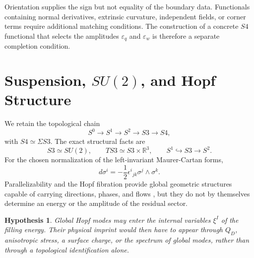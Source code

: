 \documentclass[11pt,a4paper]{article}
\def\Sthree{S3}%
\def\Sfour{S4}%
\def\dd{d}%
\numberwithin{equation}{section}
\newtheorem{hypothesis}[criterion]{Hypothesis}
\theoremstyle{remark}
\newcommand{\Sthree}{S^3}
\newcommand{\Sfour}{S^4}
\newcommand{\QD}{Q_D}
\newcommand{\dd}{\mathrm{d}}
\begin{document}
Orientation supplies the sign but not equality of the boundary data. Functionals containing normal derivatives, extrinsic curvature, independent fields, or corner terms require additional matching conditions. The construction of a concrete \(\Sfour\) functional that selects the amplitudes \(\varepsilon_q\) and \(\varepsilon_w\) is therefore a separate completion condition.

\section{Suspension, \texorpdfstring{$SU(2)$}{SU(2)}, and Hopf Structure}
We retain the topological chain
\begin{equation}
S^0\longrightarrow S^1\longrightarrow S^2\longrightarrow \Sthree\longrightarrow \Sfour,
\end{equation}
with \(\Sfour\simeq \Sigma\Sthree\). The exact structural facts are
\begin{equation}
\Sthree\simeq SU(2),
\qquad
T\Sthree\simeq \Sthree\times\mathbb{R}^3,
\qquad
S^1\hookrightarrow \Sthree\to S^2.
\end{equation}
For the chosen normalization of the left-invariant Maurer-Cartan forms,
\begin{equation}
\dd\sigma^i=-\frac{1}{2}\epsilon^i{}_{jk}\sigma^j\wedge\sigma^k.
\end{equation}
Parallelizability and the Hopf fibration provide global geometric structures capable of carrying directions, phases, and flows \cite{Hopf1931}, but they do not by themselves determine an energy or the amplitude of the residual sector.

\begin{hypothesis}
Global Hopf modes may enter the internal variables \(\xi^I\) of the filling energy. Their physical imprint would then have to appear through \(\QD\), anisotropic stress, a surface charge, or the spectrum of global modes, rather than through a topological identification alone.
\end{hypothesis}
\end{document}
